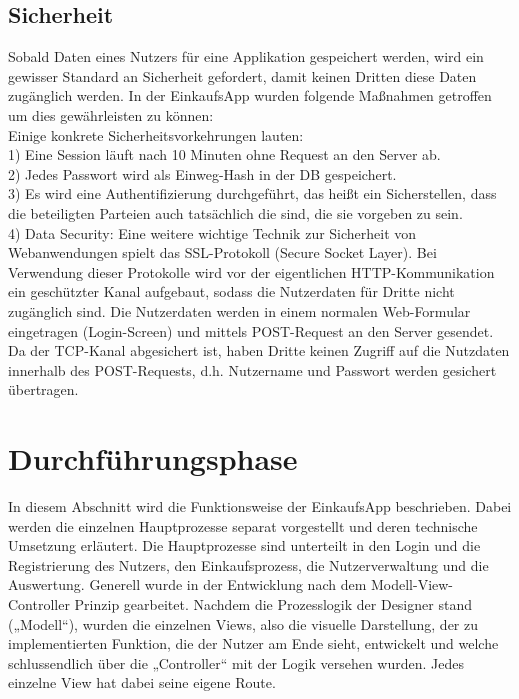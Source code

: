 \documentclass[12pt,a4paper]{article}
\begin{document}
\subsection{Sicherheit}
Sobald Daten eines Nutzers für eine Applikation gespeichert werden, wird ein gewisser Standard an Sicherheit gefordert, damit keinen Dritten diese Daten zugänglich werden.
In der EinkaufsApp wurden folgende Maßnahmen getroffen um dies gewährleisten zu können:
\\
Einige konkrete Sicherheitsvorkehrungen lauten:
\\
1)	Eine Session läuft nach 10 Minuten ohne Request an den Server ab.
\\
2)	Jedes Passwort wird als Einweg-Hash in der DB gespeichert.
\\
3)	Es wird eine Authentifizierung durchgeführt, das heißt ein Sicherstellen, dass die beteiligten Parteien auch tatsächlich die sind, die sie vorgeben zu sein.
\\
4)	Data Security: Eine weitere wichtige Technik zur Sicherheit von Webanwendungen spielt das SSL-Protokoll (Secure Socket Layer). Bei Verwendung dieser Protokolle wird vor der eigentlichen HTTP-Kommunikation ein geschützter Kanal aufgebaut, 
sodass die Nutzerdaten für Dritte nicht zugänglich sind. Die Nutzerdaten werden in einem normalen Web-Formular eingetragen (Login-Screen) und mittels POST-Request an den Server gesendet. Da der TCP-Kanal abgesichert ist, haben Dritte keinen Zugriff auf die 
Nutzdaten innerhalb des POST-Requests, d.h. Nutzername und Passwort werden gesichert übertragen.
\newpage
\section{Durchführungsphase}

In diesem Abschnitt wird die Funktionsweise der EinkaufsApp beschrieben. Dabei werden die einzelnen Hauptprozesse separat vorgestellt und deren technische Umsetzung erläutert. Die Hauptprozesse sind unterteilt in den Login und die Registrierung des Nutzers, den Einkaufsprozess, die Nutzerverwaltung und die Auswertung. 
Generell wurde in der Entwicklung nach dem Modell-View-Controller Prinzip gearbeitet. Nachdem die Prozesslogik der Designer stand („Modell“), wurden die einzelnen Views, also die visuelle Darstellung, der zu implementierten Funktion, die der Nutzer am Ende sieht, entwickelt und welche schlussendlich über die „Controller“ mit der Logik versehen wurden. Jedes einzelne View hat dabei seine eigene Route.
\end{document}
